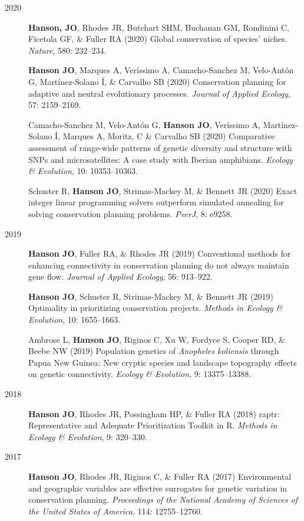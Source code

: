 \documentclass[12pt,a4paper]{article}
\begin{document}
\begin{description}
\item[2020] \textbf{Hanson, JO}, Rhodes JR, Butchart SHM, Buchanan GM, Rondinini C, Ficetola GF, \& Fuller RA (2020) Global conservation of species' niches. \textit{Nature}, 580: 232--234.

\item[] \textbf{Hanson JO}, Marques A, Veríssimo A, Camacho-Sanchez M, Velo-Antón G, Martínez-Solano Í, \& Carvalho SB (2020) Conservation planning for adaptive and neutral evolutionary processes. \textit{Journal of Applied Ecology}, 57: 2159--2169.

\item[] Camacho-Sanchez M, Velo-Antón G, \textbf{Hanson JO}, Veríssimo A, Martínez-Solano Í, Marques A, Moritz, C \& Carvalho SB (2020) Comparative assessment of range-wide patterns of genetic diversity and structure with SNPs and microsatellites: A case study with Iberian amphibians. \textit{Ecology \& Evolution}, 10: 10353--10363.

\item[] Schuster R, \textbf{Hanson JO}, Strimas-Mackey M, \& Bennett JR (2020) Exact integer linear programming solvers outperform simulated annealing for solving conservation planning problems. \textit{PeerJ}, 8: e9258.

\item[2019] \textbf{Hanson JO}, Fuller RA, \& Rhodes JR (2019) Conventional methods for enhancing connectivity in conservation planning do not always maintain gene flow. \textit{Journal of Applied Ecology}, 56: 913--922.

\item[] \textbf{Hanson JO}, Schuster R, Strimas-Mackey M, \& Bennett JR (2019) Optimality in prioritizing conservation projects. \textit{Methods in Ecology \& Evolution}, 10: 1655--1663.

\item[] Ambrose L, \textbf{Hanson JO}, Riginos C, Xu W, Fordyce S, Cooper RD, \& Beebe NW (2019) Population genetics of \textit{Anopheles koliensis} through Papua New Guinea: New cryptic species and landscape topography effects on genetic connectivity. \textit{Ecology \& Evolution}, 9: 13375--13388.

\item[2018] \textbf{Hanson JO}, Rhodes JR, Possingham HP, \& Fuller RA (2018) raptr: Representative and Adequate Prioritization Toolkit in R. \textit{Methods in Ecology \& Evolution}, 9: 320--330.

\item[2017] \textbf{Hanson JO}, Rhodes JR, Riginos C, \& Fuller RA (2017) Environmental and geographic variables are effective surrogates for genetic variation in conservation planning. \textit{Proceedings of the National Academy of Sciences of the United States of America}, 114: 12755--12760.


\end{description}
\end{document}
